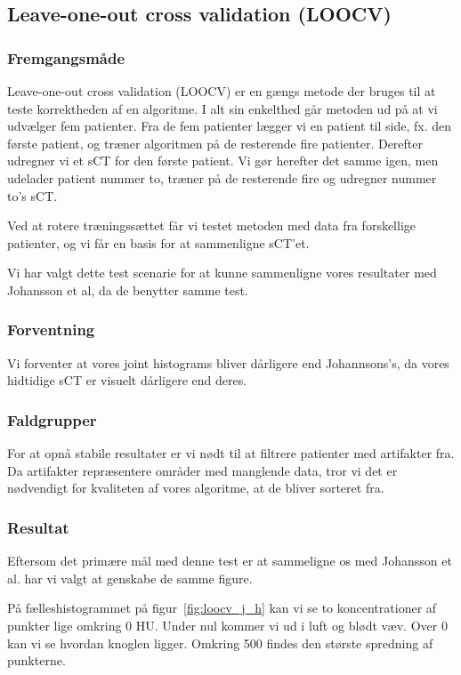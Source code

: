 \subsection{Leave-one-out cross validation (LOOCV)}
\subsubsection{Fremgangsmåde}
Leave-one-out cross validation (LOOCV) er en gængs metode der bruges til at teste korrektheden af en algoritme. I alt sin enkelthed går metoden ud på at vi udvælger fem patienter. Fra de fem patienter lægger vi en patient til side, fx. den første patient, og træner algoritmen på de resterende fire patienter. Derefter udregner vi et sCT for den første patient. Vi gør herefter det samme igen, men udelader patient nummer to, træner på de resterende fire og udregner nummer to's sCT. 

Ved at rotere træningssættet får vi testet metoden med data fra forskellige patienter, og vi får en basis for at sammenligne sCT'et.

Vi har valgt dette test scenarie for at kunne sammenligne vores resultater med Johansson et al, da de benytter samme test.

\subsubsection{Forventning}
Vi forventer at vores joint histograms bliver dårligere end Johannsons's, da vores hidtidige sCT er visuelt dårligere end deres.


\subsubsection{Faldgrupper}
For at opnå stabile resultater er vi nødt til at filtrere patienter med artifakter fra. Da artifakter repræsentere områder med manglende data, tror vi det er nødvendigt for kvaliteten af vores algoritme, at de bliver sorteret fra.

\subsubsection{Resultat}

Eftersom det primære mål med denne test er at sammeligne os med Johansson et al. har vi valgt at genskabe de samme figure.

På fælleshistogrammet på figur~\ref{fig:loocv_j_h} kan vi se to koncentrationer af punkter lige omkring 0 HU. Under nul kommer vi ud i luft og blødt væv. Over 0 kan vi se hvordan knoglen ligger. Omkring 500 findes den største spredning af punkterne.


